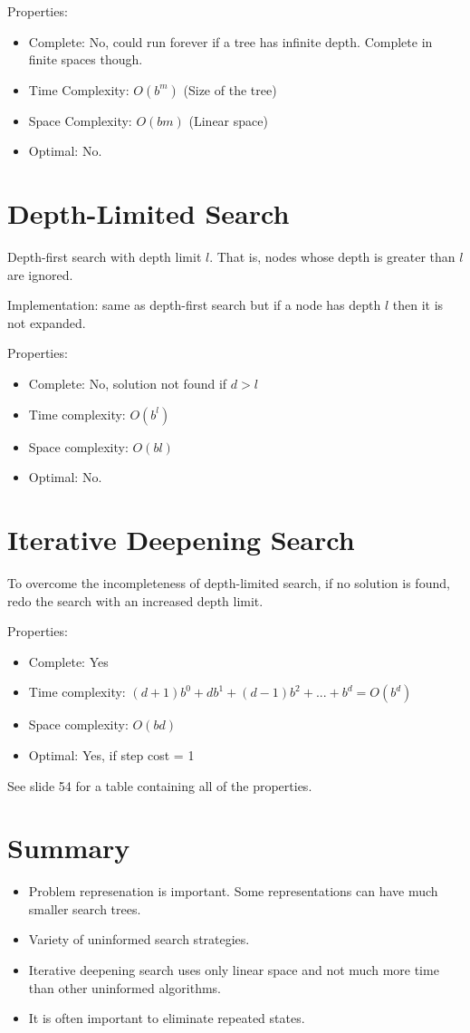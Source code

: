 \documentclass{article}
\begin{document}
Properties:
\begin{itemize}
	\item Complete: No, could run forever if a tree has infinite depth. Complete in finite spaces though.
	\item Time Complexity: $O(b^m)$ (Size of the tree)
	\item Space Complexity: $O(bm)$ (Linear space)
	\item Optimal: No.
\end{itemize}

\section{Depth-Limited Search}
Depth-first search with depth limit $l$.
That is, nodes whose depth is greater than $l$ are ignored.

Implementation: same as depth-first search but if a node has depth $l$ then it is not expanded.

Properties:
\begin{itemize}
	\item Complete: No, solution not found if $d>l$
	\item Time complexity: $O(b^l)$
	\item Space complexity: $O(bl)$ 
	\item Optimal: No.
\end{itemize}

\section{Iterative Deepening Search}
To overcome the incompleteness of depth-limited search, if no solution is found, redo the search with an increased depth limit.

Properties:
\begin{itemize}
	\item Complete: Yes
	\item Time complexity: $(d+1)b^0 + db^1 + (d-1)b^2 + ... + b^d = O(b^d)$
	\item Space complexity: $O(bd)$
	\item Optimal: Yes, if step cost = 1
\end{itemize}

See slide 54 for a table containing all of the properties.

\section{Summary}
\begin{itemize}
	\item Problem represenation is important.
		Some representations can have much smaller search trees.
	\item Variety of uninformed search strategies.
	\item Iterative deepening search uses only linear space and not much more time than other uninformed algorithms.
	\item It is often important to eliminate repeated states.
\end{itemize}
\end{document}
